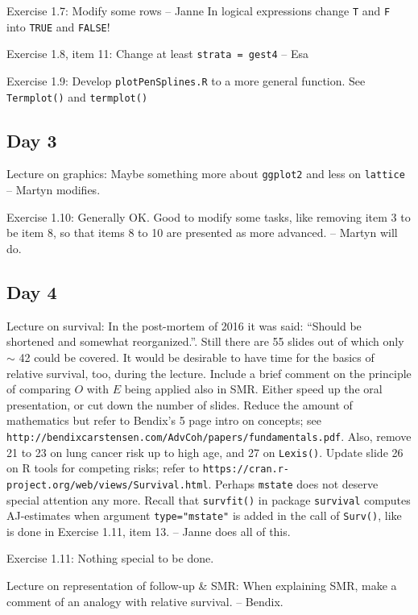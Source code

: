 Exercise 1.7: Modify some rows -- Janne
In logical expressions change {\tt T} and {\tt F} into {\tt TRUE} and {\tt FALSE}!


Exercise 1.8, item 11: Change at least {\tt strata = gest4} -- Esa

Exercise 1.9: Develop {\tt plotPenSplines.R} to a more general function.
See {\tt Termplot()} and {\tt termplot()} 

\subsection*{Day 3}

Lecture on graphics: Maybe something more about {\tt ggplot2} 
and less on {\tt lattice} -- Martyn modifies.

Exercise 1.10: Generally OK. Good to modify some tasks, like removing item 3 to be item 8, so that items 8 to 10 are presented as more advanced. -- Martyn will do.

\subsection*{Day 4}

Lecture on survival: In the post-mortem of 2016 it was said: 
``Should be shortened and somewhat reorganized.''. 
Still there are 55 slides out of which only $\sim$ 42 could be covered. 
It would be desirable to have time for the basics of relative survival, too,
during the lecture. Include a brief comment on the principle of
comparing $O$ with $E$ being applied also in SMR.
Either speed up the oral presentation, or cut down the number of slides.
Reduce the amount of mathematics but refer to Bendix's 5 page intro
on concepts; see \verb|http://bendixcarstensen.com/AdvCoh/papers/fundamentals.pdf|.
Also, remove 21 to 23 on lung cancer risk up to high age, and 27 on {\tt Lexis()}.
Update slide 26 on R tools for competing risks; refer
to \verb|https://cran.r-project.org/web/views/Survival.html|.
 Perhaps {\tt mstate} does not deserve special attention any more.
Recall that {\tt survfit()} 
in package {\tt survival} computes AJ-estimates when argument {\tt type="mstate"}
is added in the call of {\tt Surv()}, like is done in Exercise 1.11, item 13.
-- Janne does all of this.

Exercise 1.11: Nothing special to be done. 

Lecture on representation of follow-up \& SMR: When explaining SMR, make a comment
of an analogy with relative survival. -- Bendix. 

